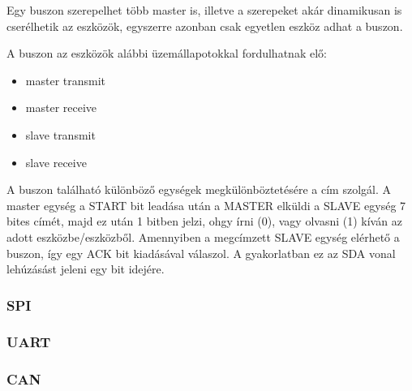 Egy buszon szerepelhet több master is, illetve a szerepeket akár dinamikusan is cserélhetik az eszközök, egyszerre azonban csak egyetlen eszköz adhat a buszon.

A buszon az eszközök alábbi üzemállapotokkal fordulhatnak elő:
\begin{itemize}
    \item master transmit
    \item master receive
    \item slave transmit
    \item slave receive
\end{itemize}

A buszon található különböző egységek megkülönböztetésére a cím szolgál. A master egység a START bit leadása után a MASTER elküldi a SLAVE egység 7 bites címét, majd ez után 1 bitben jelzi, ohgy írni (0), vagy olvasni (1) kíván az adott eszközbe/eszközből. Amennyiben a megcímzett SLAVE egység elérhető a buszon, így egy ACK bit kiadásával válaszol. A gyakorlatban ez az SDA vonal lehúzásást jeleni egy bit idejére.











\subsubsection{SPI}





\subsubsection{UART}








\subsubsection{CAN}













\vspace{-1.5mm}
\newpage